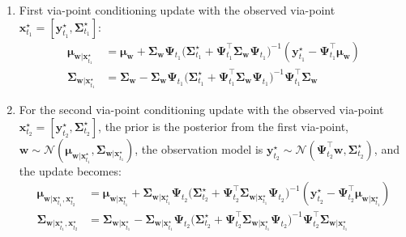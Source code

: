 \documentclass{article}
\begin{document}
\begin{enumerate}
\item First via-point conditioning update with the observed via-point $\bm{x}_{t_{1}}^\star = [\bm{y}_{t_{1}}^\star, \bm{\Sigma}^\star_{t_{1}}]$:
\begin{align}
\bm{\mu}_{\bm{w}|\bm{x}_{t_{1}}^\star} &= \bm{\mu_w} + \bm{\Sigma_w}\bm{\Psi}_{t_1} \Big(\bm{\Sigma}_{t_{1}}^\star + \bm{\Psi}_{t_1}^\top \bm{\Sigma_w}\bm{\Psi}_{t_1} \Big)^{-1} (\bm{y}_{t_{1}}^\star - \bm{\Psi}_{t_1}^\top \bm{\mu_w})\\
\bm{\Sigma}_{\bm{w}|\bm{x}_{t_{1}}^\star} &= \bm{\Sigma_w} - \bm{\Sigma_w}\bm{\Psi}_{t_1} \Big(\bm{\Sigma}_{t_{1}}^\star +  \bm{\Psi}_{t_1}^\top \bm{\Sigma_w}\bm{\Psi}_{t_1} \Big)^{-1} \bm{\Psi}_{t_1}^\top \bm{\Sigma_w}
\end{align}

\item For the second via-point conditioning update with the observed via-point $\bm{x}_{t_{2}}^\star = [\bm{y}_{t_{2}}^\star, \bm{\Sigma}^\star_{t_{2}}]$, the prior is the posterior from the first via-point, \ie{} $\bm{w} \sim \mathcal{N}(\bm{\mu}_{\bm{w}|\bm{x}_{t_{1}}^\star}, \bm{\Sigma}_{\bm{w}|\bm{x}_{t_{1}}^\star})$, the observation model is $\bm{y}_{t_{2}}^\star \sim \mathcal{N}(\bm{\Psi}_{t_2}^\top \bm{w}, \bm{\Sigma}_{t_{2}}^\star)$, and the update becomes:
\begin{align}
\bm{\mu}_{\bm{w}|\bm{x}_{t_{1}}^{\star}, \bm{x}_{t_{2}}^\star} &= \bm{\mu}_{\bm{w}|\bm{x}_{t_{1}}^\star} + \bm{\Sigma}_{\bm{w}|\bm{x}_{t_{1}}^\star}\bm{\Psi}_{t_2} \Big(\bm{\Sigma}_{t_{2}}^\star + \bm{\Psi}_{t_2}^\top \bm{\Sigma}_{\bm{w}|\bm{x}_{t_{1}}^\star}\bm{\Psi}_{t_2} \Big)^{-1} (\bm{y}_{t_{2}}^\star - \bm{\Psi}_{t_2}^\top \bm{\mu}_{\bm{w}|\bm{x}_{t_{1}}^\star})\\
\bm{\Sigma}_{\bm{w}|\bm{x}_{t_{1}}^{\star}, \bm{x}_{t_{2}}^\star} &= \bm{\Sigma}_{\bm{w}|\bm{x}_{t_{1}}^\star} - \bm{\Sigma}_{\bm{w}|\bm{x}_{t_{1}}^\star}\bm{\Psi}_{t_2} \Big(\bm{\Sigma}_{t_{2}}^\star +  \bm{\Psi}_{t_2}^\top \bm{\Sigma}_{\bm{w}|\bm{x}_{t_{1}}^\star}\bm{\Psi}_{t_2} \Big)^{-1} \bm{\Psi}_{t_2}^\top \bm{\Sigma}_{\bm{w}|\bm{x}_{t_{1}}^\star}
\end{align}


\end{enumerate}
\end{document}
